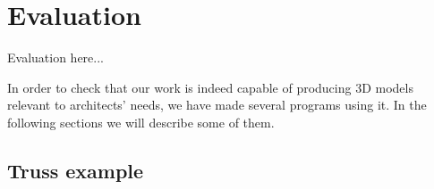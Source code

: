 
\chapter{Evaluation}
\label{chapter:evaluation}
Evaluation here...

In order to check that our work is indeed capable of producing 3D models relevant to architects' needs, we have made several programs using it.
In the following sections we will describe some of them.

\section{Truss example}



